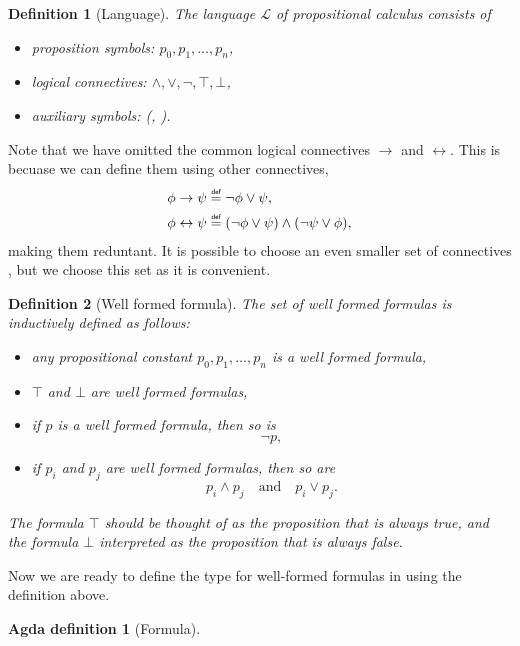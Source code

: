 \documentclass[titlepage]{article}
\newcommand\myeq{\mathrel{\overset{\makebox[0pt]{\mbox{\normalfont\tiny\sffamily def}}}{=}}}
\newtheorem{definition}{Definition}[section]
\newtheorem{agdadef}{Agda definition}
\begin{document}
\begin{definition}[Language]\label{language}
    The language $\mathcal{L}$ of propositional calculus consists of
    \begin{itemize}
        \item proposition symbols: $p_0,p_1,\hdots,p_n$,
        \item logical connectives: $\wedge,\vee,\neg,\top,\bot$,
        \item auxiliary symbols: (, ).
    \end{itemize}
\end{definition}
Note that we have omitted the common logical connectives $\rightarrow$ and $\leftrightarrow$. This is becuase we can define them using other connectives, 
\begin{align*}
    \phi \rightarrow \psi &\myeq \neg \phi \vee \psi, \\
    \phi \leftrightarrow \psi &\myeq (\neg \phi \vee \psi) \wedge (\neg \psi \vee \phi),
\end{align*}making them reduntant. It is possible to choose an even smaller set of connectives \cite{vanDalen}, but we choose this set as it is convenient.

\begin{definition}[Well formed formula]\label{wellformed}
    The set of well formed formulas is inductively defined as follows:
    \begin{itemize}
        \item any propositional constant $p_0,p_1,\hdots,p_n$ is a well formed formula,
        \item $\top$ and $\bot$ are well formed formulas,
        \item if $p$ is a well formed formula, then so is
        $$\neg p,$$
        \item if $p_i$ and $p_j$ are well formed formulas, then so are
            $$p_i \wedge p_j \quad \text{and} \quad p_i \vee p_j.$$
    \end{itemize}
    The formula $\top$ should be thought of as the proposition that is always true, and the formula $\bot$ interpreted as the proposition that is always false.
\end{definition}

Now we are ready to define the type for well-formed formulas in \Agda using the definition above.
\begin{agdadef}[Formula]$ $
\end{agdadef}
\end{document}
